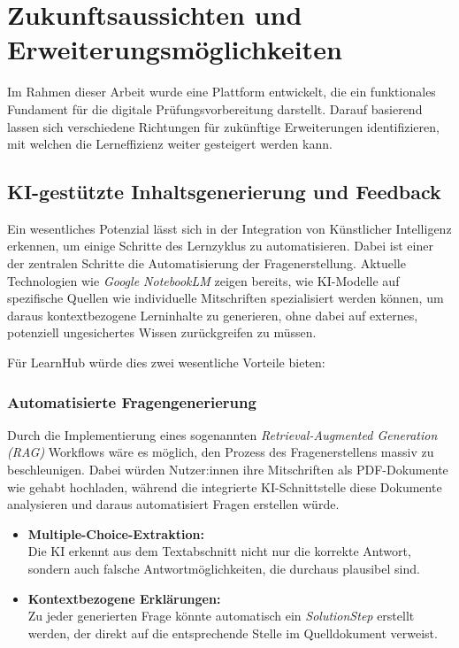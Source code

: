 \section{Zukunftsaussichten und Erweiterungsmöglichkeiten}
\label{chap:FutureOfLearnhub}
 \setauthor{\firstauthor}

Im Rahmen dieser Arbeit wurde eine Plattform entwickelt, die ein funktionales Fundament für die digitale Prüfungsvorbereitung darstellt. Darauf basierend lassen sich verschiedene Richtungen für zukünftige Erweiterungen identifizieren, mit welchen die Lerneffizienz weiter gesteigert werden kann.


\subsection{KI-gestützte Inhaltsgenerierung und Feedback}

Ein wesentliches Potenzial lässt sich in der Integration von Künstlicher Intelligenz erkennen, um einige Schritte des Lernzyklus zu automatisieren. Dabei ist einer der zentralen Schritte die Automatisierung der Fragenerstellung. Aktuelle Technologien wie \textit{Google NotebookLM} \cite{GoogleNotebookLM} zeigen bereits, wie KI-Modelle auf spezifische Quellen wie individuelle Mitschriften spezialisiert werden können, um daraus kontextbezogene Lerninhalte zu generieren, ohne dabei auf externes, potenziell ungesichertes Wissen zurückgreifen zu müssen.

Für LearnHub würde dies zwei wesentliche Vorteile bieten:

\subsubsection{Automatisierte Fragengenerierung}
Durch die Implementierung eines sogenannten \textit{Retrieval-Augmented Generation (RAG)} \cite{RAG} Workflows wäre es möglich, den Prozess des Fragenerstellens massiv zu beschleunigen. Dabei würden Nutzer:innen ihre Mitschriften als PDF-Dokumente wie gehabt hochladen, während die integrierte KI-Schnittstelle diese Dokumente analysieren und daraus automatisiert Fragen erstellen würde.

\begin{itemize}
	\item \textbf{Multiple-Choice-Extraktion:} \\
	Die KI erkennt aus dem Textabschnitt nicht nur die korrekte Antwort, sondern auch falsche Antwortmöglichkeiten, die durchaus plausibel sind.
	\item \textbf{Kontextbezogene Erklärungen:} \\
	Zu jeder generierten Frage könnte automatisch ein \textit{SolutionStep} erstellt werden, der direkt auf die entsprechende Stelle im Quelldokument verweist.
\end{itemize}

